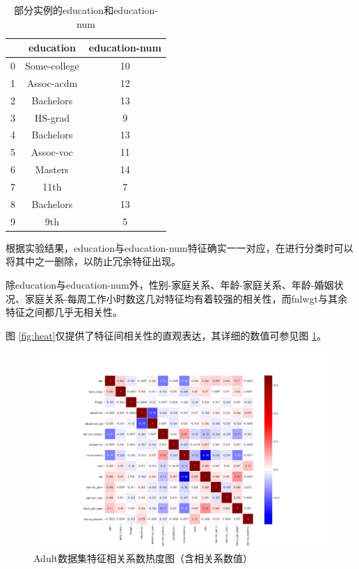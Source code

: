 \documentclass[12pt,a4paper]{article}
\theoremstyle{definition}
\begin{document}
\begin{table}[H]
	\renewcommand\arraystretch{1.35}
	\caption{部分实例的education和education-num}
	\label{tab:guess}
	\centering
	
	\begin{tabular}{c||c|c}
		\centering
		 & education & education-num \\
		\hline
		\hline
		
		0 & Some-college & 10 \\
		1 & Assoc-acdm & 12 \\
		2 & Bachelors & 13 \\
		3 & HS-grad & 9 \\
		4 & Bachelors & 13 \\
		5 & Assoc-voc & 11 \\
		6 & Masters & 14 \\
		7 & 11th & 7 \\
		8 & Bachelors & 13 \\
		9 & 9th & 5 \\

	\end{tabular}
\end{table}

根据实验结果，education与education-num特征确实一一对应，在进行分类时可以将其中之一删除，以防止冗余特征出现。

\vspace{0.01\linewidth}
除education与education-num外，性别-家庭关系、年龄-家庭关系、年龄-婚姻状况、家庭关系-每周工作小时数这几对特征均有着较强的相关性，而fnlwgt与其余特征之间都几乎无相关性。

\vspace{0.01\linewidth}
图 \ref{fig:heat}仅提供了特征间相关性的直观表达，其详细的数值可参见图 \ref{fig:heat2}。

\begin{figure}[H]
	\centering
	\includegraphics[width=0.85\linewidth]{img/cof_heat_anno.png}
	\caption{Adult数据集特征相关系数热度图（含相关系数值）}
	\label{fig:heat2}
\end{figure}
\end{document}
